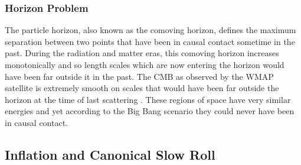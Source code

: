 \subsubsection{Horizon Problem} \label{sec:horizprob}
The particle horizon, also known
as the comoving horizon, defines the maximum separation between two points that
have been in causal contact sometime in the past. During the radiation and
matter eras, this comoving horizon increases monotonically and so length scales
which are now entering the horizon would have been far outside it in
the past. 
The CMB as observed by the WMAP satellite is extremely smooth on scales that
would have been far outside the horizon at the time of last scattering
\cite{Komatsu:2008hk}. These regions of space have very similar energies and
yet according to the Big Bang scenario they could never have been in causal contact. 

% 
% 



\subsection{Inflation and Canonical Slow Roll}
\label{sec:slowroll-intro}

